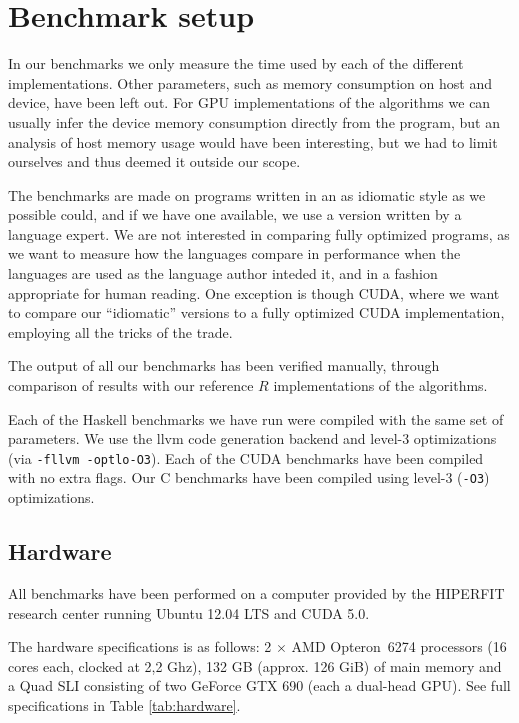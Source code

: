 
\section{Benchmark setup}
In our benchmarks we only measure the time used by each of the
different implementations. Other parameters, such as memory
consumption on host and device, have been left out. For GPU
implementations of the algorithms we can usually infer the device
memory consumption directly from the program, but an analysis of host
memory usage would have been interesting, but we had to limit
ourselves and thus deemed it outside our scope.

The benchmarks are made on programs written in an as idiomatic style
as we possible could, and if we have one available, we use a version
written by a language expert. We are not interested in comparing fully
optimized programs, as we want to measure how the languages compare in
performance when the languages are used as the language author inteded
it, and in a fashion appropriate for human reading. One exception is
though CUDA, where we want to compare our ``idiomatic'' versions to a
fully optimized CUDA implementation, employing all the tricks of the
trade.

The output of all our benchmarks has been verified manually, through
comparison of results with our reference $R$ implementations of the
algorithms.

Each of the Haskell benchmarks we have run were compiled with the same set of
parameters. We use the llvm code generation backend and level-3
optimizations (via \verb|-fllvm -optlo-O3|).  Each of the CUDA benchmarks have been
compiled with no extra flags. Our C benchmarks have been compiled using level-3
(\verb|-O3|) optimizations.

\subsection{Hardware}
All benchmarks have been performed on a computer provided by the
HIPERFIT research center running Ubuntu 12.04 LTS and CUDA 5.0.

The hardware specifications is as follows: 2 $\times$ AMD
Opteron\texttrademark\ 6274 processors (16 cores each, clocked at 2,2
Ghz), 132 GB (approx. 126 GiB) of main memory and a Quad SLI
consisting of two GeForce GTX 690 (each a dual-head GPU). See full
specifications in Table \ref{tab:hardware}.

